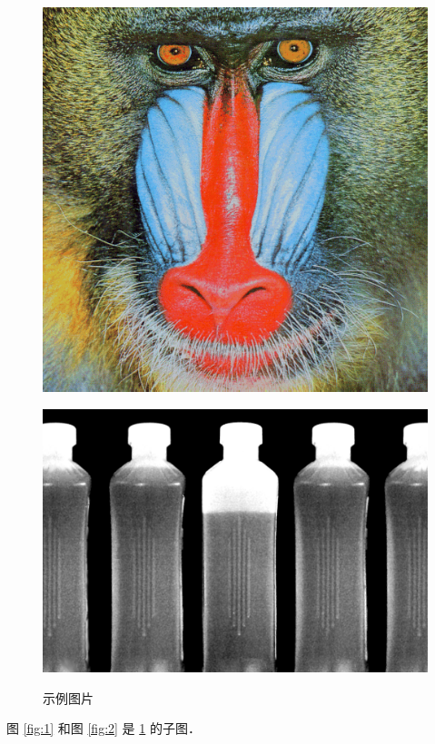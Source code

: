 \documentclass[fonset = fandol]{ctexart}
\begin{document}
\begin{figure}
	\centering
	\begin{minipage}[b]{0.48\linewidth}
		\centering
		\includegraphics[width=\linewidth]{image1}
		\label{fig:1}
	\end{minipage}
	\hfill
	\begin{minipage}[b]{0.48\linewidth}
		\centering
		\includegraphics[width=\linewidth]{image2}
		\label{fig:2}
	\end{minipage}
	\caption{示例图片}
	\label{fig:3}
\end{figure}

图 \ref{fig:1} 和图 \ref{fig:2} 是 \ref{fig:3} 的子图．
\end{document}
